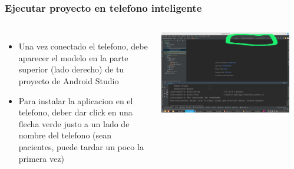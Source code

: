 \begin{frame}
\frametitle{Ejecutar proyecto en telefono inteligente} 
\begin{columns}

\begin{itemize}
\item Una vez conectado el telefono, debe aparecer el modelo en la parte superior (lado derecho) de tu proyecto de Android Studio
\item Para instalar la aplicacion en el telefono, deber dar click en una flecha verde justo a un lado de nombre del telefono (sean pacientes, puede tardar un poco la primera vez)
\end{itemize}
\begin{center}
\includegraphics[width=0.65\linewidth]{00_Configurar/AndroidStudio_SmartphoneReconocido.png}    
\end{center}
\begin{center}

\end{center}
\end{columns}
\end{frame}
